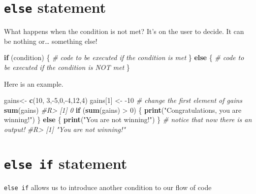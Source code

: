 \documentclass[]{book}
\newenvironment{Shaded}{}{}
\newcommand{\CommentTok}[1]{\textcolor[rgb]{0.38,0.63,0.69}{\textit{#1}}}
\newcommand{\ControlFlowTok}[1]{\textcolor[rgb]{0.00,0.44,0.13}{\textbf{#1}}}
\newcommand{\DecValTok}[1]{\textcolor[rgb]{0.25,0.63,0.44}{#1}}
\newcommand{\KeywordTok}[1]{\textcolor[rgb]{0.00,0.44,0.13}{\textbf{#1}}}
\newcommand{\NormalTok}[1]{#1}
\newcommand{\OperatorTok}[1]{\textcolor[rgb]{0.40,0.40,0.40}{#1}}
\newcommand{\StringTok}[1]{\textcolor[rgb]{0.25,0.44,0.63}{#1}}
\theoremstyle{definition}
\theoremstyle{definition}
\theoremstyle{definition}
\theoremstyle{remark}
\begin{document}
\hypertarget{else-statement}{%
\section{\texorpdfstring{\texttt{else}
statement}{else statement}}\label{else-statement}}

What happens when the condition is not met? It's on the user to decide.
It can be nothing or\ldots{} something else!

\begin{Shaded}
\begin{Highlighting}[]
\ControlFlowTok{if}\NormalTok{ (condition) \{ }
\CommentTok{# code to be executed if the condition is met}
\NormalTok{\} }\ControlFlowTok{else}\NormalTok{ \{}
\CommentTok{# code to be executed if the condition is NOT met}
\NormalTok{\}}
\end{Highlighting}
\end{Shaded}

Here is an example.

\begin{Shaded}
\begin{Highlighting}[]
\NormalTok{gains<-}\StringTok{ }\KeywordTok{c}\NormalTok{(}\DecValTok{10}\NormalTok{, }\DecValTok{3}\NormalTok{,}\OperatorTok{-}\DecValTok{5}\NormalTok{,}\DecValTok{0}\NormalTok{,}\OperatorTok{-}\DecValTok{4}\NormalTok{,}\DecValTok{12}\NormalTok{,}\DecValTok{4}\NormalTok{)}
\NormalTok{gains[}\DecValTok{1}\NormalTok{] <-}\StringTok{ }\DecValTok{-10} \CommentTok{# change the first element of gains}
\KeywordTok{sum}\NormalTok{(gains)}
\CommentTok{#R> [1] 0}
\ControlFlowTok{if}\NormalTok{ (}\KeywordTok{sum}\NormalTok{(gains) }\OperatorTok{>}\StringTok{ }\DecValTok{0}\NormalTok{) \{}
  \KeywordTok{print}\NormalTok{(}\StringTok{"Congratulations, you are winning!"}\NormalTok{)}
\NormalTok{\} }\ControlFlowTok{else}\NormalTok{ \{}
  \KeywordTok{print}\NormalTok{(}\StringTok{"You are not winning!"}\NormalTok{)}
\NormalTok{\} }\CommentTok{# notice that now there is an output!}
\CommentTok{#R> [1] "You are not winning!"}
\end{Highlighting}
\end{Shaded}

\hypertarget{else-if-statement}{%
\section{\texorpdfstring{\texttt{else\ if}
statement}{else if statement}}\label{else-if-statement}}

\texttt{else\ if} allows us to introduce another condition to our flow
of code
\end{document}
